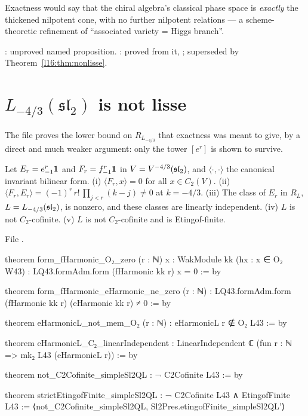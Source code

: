 \begin{physics}
Exactness would say that the chiral algebra's classical phase space is \emph{exactly} the thickened nilpotent cone, with no
further nilpotent relations --- a scheme-theoretic refinement of ``associated variety = Higgs branch''.
\end{physics}

\begin{status}
: unproved named proposition. \allowbreak{}\allowbreak{}: proved from it,
\lean{[propext, Classical.}\allowbreak{}\allowbreak\lean{sound]}; superseded by Theorem~\ref{l16:thm:nonlisse}.
\end{status}

\section{$L_{-4/3}(\mathfrak{sl}_2)$ is not lisse}\label{l16:sec:nonlisse}

The file  proves the lower bound on $R_{L_{-4/3}}$ that exactness was meant to give, by a
direct and much weaker argument: only the tower $[e^r]$ is shown to survive.

\begin{theorem}\label{l16:thm:nonlisse}
Let $E_r = e_{-1}^r\mathbf{1}$ and $F_r = f_{-1}^r\mathbf{1}$ in $V = V^{-4/3}(\mathfrak{sl}_2)$, and $\langle\cdot,\cdot\rangle$ the
canonical invariant bilinear form. (i) $\langle F_r, x\rangle = 0$ for all $x\in C_2(V)$. (ii) $\langle F_r,E_r\rangle =
(-1)^r\,r!\,\prod_{j<r}(k-j)\ne0$ at $k=-4/3$. (iii) The class of $E_r$ in $R_{L}$, $L = L_{-4/3}(\mathfrak{sl}_2)$, is nonzero,
and these classes are linearly independent. (iv) $L$ is not $C_2$-cofinite. (v) $L$ is not $C_2$-cofinite and is
Etingof-finite.
\end{theorem}
\noindent File .
\begin{leancode}
theorem form_fHarmonic_O₂_zero (r : ℕ) {x : WakModule kk} (hx : x ∈ O₂ W43) :
    LQ43.formAdm.form (fHarmonic kk r) x = 0 := by

theorem form_fHarmonic_eHarmonic_ne_zero (r : ℕ) :
    LQ43.formAdm.form (fHarmonic kk r) (eHarmonic kk r) ≠ 0 := by

theorem eHarmonicL_not_mem_O₂ (r : ℕ) : eHarmonicL r ∉ O₂ L43 := by

theorem eHarmonicL_C₂_linearIndependent :
    LinearIndependent ℂ (fun r : ℕ => mk₂ L43 (eHarmonicL r)) := by

theorem not_C2Cofinite_simpleSl2QL : ¬ C2Cofinite L43 := by

theorem strictEtingofFinite_simpleSl2QL :
    ¬ C2Cofinite L43 ∧ EtingofFinite L43 :=
  ⟨not_C2Cofinite_simpleSl2QL, Sl2Pres.etingofFinite_simpleSl2QL'⟩
\end{leancode}

